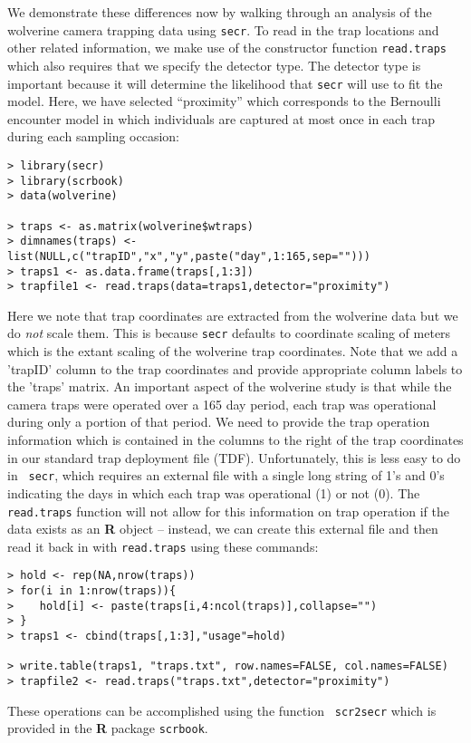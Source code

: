 We demonstrate these differences now by walking through an analysis of
the wolverine camera trapping data using \mbox{\tt secr}.  To read in
the trap locations and other related information, we make use of the
constructor function \mbox{\tt read.traps} which also requires that we
specify the detector type.  The detector type is important because it
will determine the likelihood that \mbox{\tt secr} will use to fit the
model.  Here, we have selected ``proximity'' which corresponds to the
Bernoulli encounter model in which individuals are captured at most
once in each trap during each sampling occasion: 
{\small
\begin{verbatim}
> library(secr)
> library(scrbook)
> data(wolverine)

> traps <- as.matrix(wolverine$wtraps)
> dimnames(traps) <- list(NULL,c("trapID","x","y",paste("day",1:165,sep="")))
> traps1 <- as.data.frame(traps[,1:3])
> trapfile1 <- read.traps(data=traps1,detector="proximity")
\end{verbatim}
}
Here we note that trap coordinates are extracted from the wolverine
data but we do {\it not} scale them. This is because
\mbox{\tt secr} defaults to coordinate scaling of meters which is the
extant scaling of the wolverine trap coordinates. Note that we add a 'trapID' column to
the trap coordinates and provide appropriate column labels to the
'traps' matrix. 
An important aspect of the
wolverine study is that while the camera traps were operated over a
165 day period, each trap was operational during only a portion of
that period. We need to provide the trap operation information which
is contained in the columns to the right of the trap coordinates in
our standard trap deployment file (TDF). Unfortunately, this is less easy to do in \mbox{\tt
  secr}, which requires an external file with a single long string of
1's and 0's indicating the days in which each trap was operational (1)
or not (0). The \mbox{\tt read.traps} function will not allow for this
 information on trap operation if the data exists as an {\bf R} object
 -- instead, we can create this external file and then read it back in
with \mbox{\tt read.traps} using these commands:
\begin{verbatim}
> hold <- rep(NA,nrow(traps))
> for(i in 1:nrow(traps)){
>    hold[i] <- paste(traps[i,4:ncol(traps)],collapse="")
> }
> traps1 <- cbind(traps[,1:3],"usage"=hold)

> write.table(traps1, "traps.txt", row.names=FALSE, col.names=FALSE)
> trapfile2 <- read.traps("traps.txt",detector="proximity") 
\end{verbatim}
These operations can be accomplished using the function \mbox{\tt
  scr2secr} which is provided in the {\bf R} package \mbox{\tt scrbook}.

